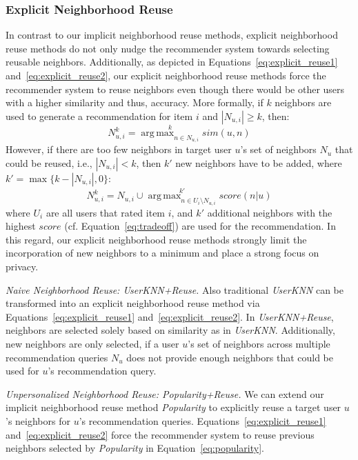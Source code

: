 \documentclass[manuscript,review,anonymous]{acmart}
\DeclareMathOperator*{\argmax}{arg\,max}
\begin{document}
\subsubsection{Explicit Neighborhood Reuse}
\label{subsubsec:explicit_reuse}
In contrast to our implicit neighborhood reuse methods, explicit neighborhood reuse methods do not only nudge the recommender system towards selecting reusable neighbors.
Additionally, as depicted in Equations~\ref{eq:explicit_reuse1} and~\ref{eq:explicit_reuse2}, our explicit neighborhood reuse methods force the recommender system to reuse neighbors even though there would be other users with a higher similarity and thus, accuracy.
More formally, if $k$ neighbors are used to generate a recommendation for item $i$ and $|N_{u, i}| \geq k$, then:
\begin{equation}
    \label{eq:explicit_reuse1}
    N^k_{u, i} = \stackrel{k}{\argmax_{n \in N_{u, i}}} sim(u, n)
\end{equation}
However, if there are too few neighbors in target user $u$'s set of neighbors $N_u$ that could be reused, i.e., $|N_{u, i}| < k$, then $k'$ new neighbors have to be added, where $k' = \max\{ k - |N_{u, i}|, 0 \}$:  
\begin{equation}
    \label{eq:explicit_reuse2}
    N^k_{u, i} = N^{}_{u, i} \cup \stackrel{k'}{\argmax_{n \in U_i\setminus N_{u, i}}} score(n|u)
\end{equation}
where $U_i$ are all users that rated item $i$, and $k'$ additional neighbors with the highest $score$ (cf. Equation~\ref{eq:tradeoff}) are used for the recommendation. 
In this regard, our explicit neighborhood reuse methods strongly limit the incorporation of new neighbors to a minimum and place a strong focus on privacy.

\vspace{2mm} \noindent \emph{Naive Neighborhood Reuse: UserKNN+Reuse.}
Also traditional \emph{UserKNN} can be transformed into an explicit neighborhood reuse method via Equations~\ref{eq:explicit_reuse1} and~\ref{eq:explicit_reuse2}.
In \emph{UserKNN+Reuse}, neighbors are selected solely based on similarity as in \emph{UserKNN}.
Additionally, new neighbors are only selected, if a user $u$'s set of neighbors across multiple recommendation queries $N_u$ does not provide enough neighbors that could be used for $u$'s recommendation query.

\vspace{2mm} \noindent \emph{Unpersonalized Neighborhood Reuse: Popularity+Reuse.}
We can extend our implicit neighborhood reuse method \emph{Popularity} to explicitly reuse a target user $u$'s neighbors for $u$'s recommendation queries.
Equations~\ref{eq:explicit_reuse1} and~\ref{eq:explicit_reuse2} force the recommender system to reuse previous neighbors selected by \emph{Popularity} in Equation~\ref{eq:popularity}.
\end{document}
